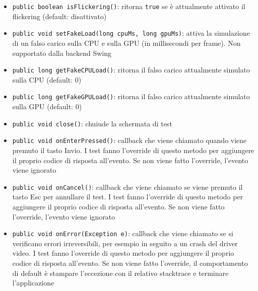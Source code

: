 \begin{itemize}
	\item \texttt{public boolean isFlickering()}: ritorna \texttt{true} se è attualmente attivato il flickering (default: disattivato)
	\item \texttt{public void setFakeLoad(long cpuMs, long gpuMs)}: attiva la simulazione di un falso carico sulla CPU e sulla GPU (in millisecondi per frame). Non supportato dalla backend Swing
	\item \texttt{public long getFakeCPULoad()}: ritorna il falso carico attualmente simulato sulla CPU (default: 0)
	\item \texttt{public long getFakeGPULoad()}: ritorna il falso carico attualmente simulato sulla GPU (default: 0)
	\item \texttt{public void close()}: chuiude la schermata di test
	\item \texttt{public void onEnterPressed()}: callback che viene chiamato quando viene premuto il tasto Invio. I test fanno l'override di questo metodo per aggiungere il proprio codice di risposta all'evento. Se non viene fatto l'override, l'evento viene ignorato
	\item \texttt{public void onCancel()}: callback che viene chiamato se viene premuto il tasto Esc per annullare il test. I test fanno l'override di questo metodo per aggiungere il proprio codice di risposta all'evento. Se non viene fatto l'override, l'evento viene ignorato
	\item \texttt{public void onError(Exception e)}: callback che viene chiamato se si verificano errori irreversibili, per esempio in seguito a un crash del driver video. I test fanno l'override di questo metodo per aggiungere il proprio codice di risposta all'evento. Se non viene fatto l'override, il comportamento di default è stampare l'eccezione con il relativo stacktrace e terminare l'applicazione
\end{itemize}

